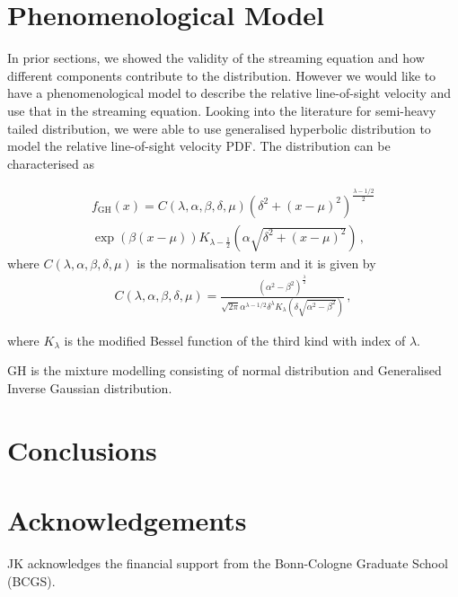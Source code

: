 \documentclass[a4paper,fleqn,usenatbib]{mnras}
\begin{document}
	\section{Phenomenological Model}

	In prior sections, we showed the validity of the streaming equation and how different components contribute to the distribution. However we would like to have a phenomenological model to describe the relative line-of-sight velocity and use that in the streaming equation. Looking into the literature for semi-heavy tailed distribution, we were able to use generalised hyperbolic distribution to model the relative line-of-sight velocity PDF. The distribution can be characterised as
	
	\begin{multline}
		f_{\mathrm{GH}}(x) = C(\lambda, \alpha,\beta,\delta,\mu) \left(\delta^2+\left(x-\mu\right)^2\right)^{\frac{\lambda-1/2}{2}}  \\
		\exp\left(\beta\left(x-\mu\right)\right) K_{\lambda-\frac{1}{2}}\left(\alpha\sqrt{\delta^2+(x-\mu)^2}\right) \, ,
	\end{multline}
	\noindent where $C(\lambda, \alpha,\beta,\delta,\mu)$ is the normalisation term and it is given by
	\begin{eqnarray}
		C(\lambda, \alpha,\beta,\delta,\mu) = \frac{\left(\alpha^2-\beta^2\right)^{\frac{\lambda}{2}}}{\sqrt{2\pi}\alpha^{\lambda - 1/2}\delta^\lambda K_{\lambda}\left(\delta\sqrt{\alpha^2-\beta^2}\right)}  \, ,
	\end{eqnarray}
	
	\noindent where $K_{\lambda}$ is the modified Bessel function of the third kind with index of $\lambda$.
	
	GH is the mixture modelling consisting of normal distribution and Generalised Inverse Gaussian distribution. 
	
	\section{Conclusions}
	
	
	\section*{Acknowledgements}
	
	JK acknowledges the financial support from the Bonn-Cologne
	Graduate School (BCGS).
	
	
\end{document}

